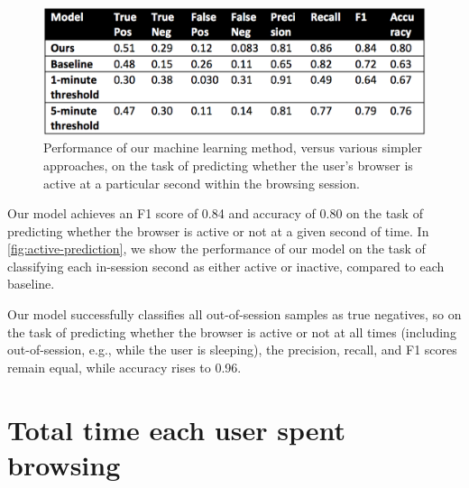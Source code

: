 \documentclass{sigchi}
\begin{document}
\begin{figure}
    \centering
    \includegraphics[width=0.9\columnwidth]{active-prediction}
    \caption{Performance of our machine learning method, versus various simpler approaches, on the task of predicting whether the user's browser is active at a particular second within the browsing session.}
    \label{fig:active-prediction}
\end{figure}

Our model achieves an F1 score of 0.84 and accuracy of 0.80 on the task of predicting whether the browser is active or not at a given second of time. In \autoref{fig:active-prediction}, we show the performance of our model on the task of classifying each in-session second as either active or inactive, compared to each baseline.

Our model successfully classifies all out-of-session samples as true negatives, so on the task of predicting whether the browser is active or not at all times (including out-of-session, e.g., while the user is sleeping), the precision, recall, and F1 scores remain equal, while accuracy rises to 0.96.

\section{Total time each user spent browsing}
\end{document}
